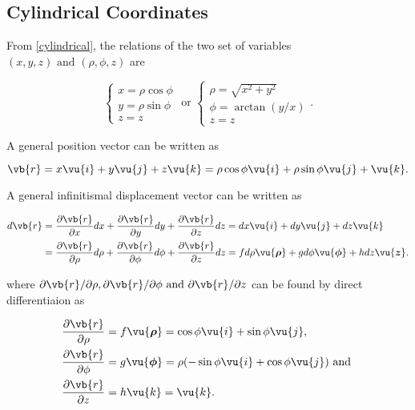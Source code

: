 \documentclass[english,a4paper,12pt]{report}
\begin{document}
	
\subsection{Cylindrical Coordinates}

From \cref{cylindrical}, the relations of the two set of variables \((x,y,z) \text { and } (\rho , \phi , z)\)  are

\begin{equation}
    \begin{cases} x = \rho \cos \phi \\ y = \rho \sin \phi \\ z = z \end{cases} \text { or } \begin{cases} \rho  = \sqrt{x^2+y^2} \\  \phi = \arctan {\left( y /x  \right)} \\ z = z \end{cases}. 
\end{equation}

A general position vector can be written as 

\begin{equation}
    \vb{r} = x \vu{i} + y \vu{j} + z \vu{k} = \rho \cos \phi  \vu{i} + \rho \sin \phi \vu{j} + \vu{k} .
\end{equation}

A general infinitismal displacement vector can be written as 

\begin{equation}
    \begin{aligned}
    d \vb{r} &= \frac{\partial \vb{r} }{\partial x} dx + \frac{\partial \vb{r} }{\partial y} dy + \frac{\partial \vb{r} }{\partial z} dz = dx \vu{i} + dy \vu{j} + dz \vu{k} \\ &= \frac{\partial \vb{r} }{\partial \rho } d\rho  + \frac{\partial \vb{r} }{\partial \phi  }d \phi  + \frac{\partial \vb{r} }{\partial z}d z =f d \rho  \vu{\boldsymbol{\rho } }  +g d\phi \vu{\boldsymbol{\phi  } } +h  d z\vu{\boldsymbol{z} }. 
    \end{aligned}
\end{equation}

where \(\partial \vb{r} / \partial \rho , \partial \vb{r} / \partial \phi  \text { and } \partial \vb{r} /\partial z  \) can be found by direct differentiaion as 

\begin{equation}
	\begin{aligned} 
		\frac{\partial \vb{r} }{\partial \rho }  &= f \vu{\boldsymbol{\rho } } = \cos{\phi}\vu{i} + \sin{\phi}\vu{j}, \\
		\frac{\partial \vb{r} }{\partial \phi }  &= g \vu{\boldsymbol{\phi } } = \rho (-\sin{\phi}\vu{i} + \cos{\phi}\vu{j}) \text { and }  \\
		\frac{\partial \vb{r} }{\partial z }  &= h \vu{k} = \vu{k}. 
	\end{aligned} 
\end{equation}
\end{document}
